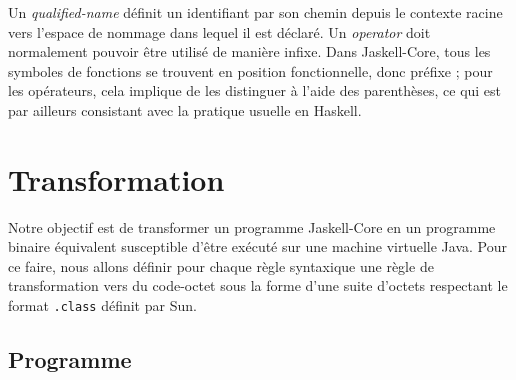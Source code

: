 
Un \emph{qualified-name} d\'efinit un identifiant par son chemin depuis
le contexte racine vers l'espace de nommage dans lequel il est
d\'eclar\'e. Un \emph{operator} doit normalement pouvoir \^etre utilis\'e de
mani\`ere infixe. Dans Jaskell-Core, tous les symboles de fonctions se
trouvent en position fonctionnelle, donc pr\'efixe ; pour les
op\'erateurs, cela implique de les distinguer \`a l'aide des parenth\`eses,
ce qui est par ailleurs consistant avec la pratique usuelle en Haskell.

\section{Transformation}

Notre objectif est de transformer un programme Jaskell-Core en un
programme binaire \'equivalent susceptible d'\^etre ex\'ecut\'e sur une machine
virtuelle \textsf{Java}. Pour ce faire, nous allons d\'efinir pour
chaque r\`egle syntaxique une r\`egle de transformation vers du code-octet
sous la forme d'une suite d'octets respectant le format
\texttt{.class} d\'efinit par Sun. 

\subsection{Programme}


